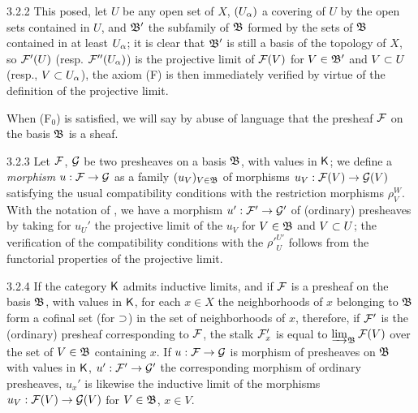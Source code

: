 \documentclass[../main.tex]{subfiles}
\begin{document}
\begin{env}{3.2.2}
This posed, let $U$ be any open set of $X$, $(U_\alpha)$ a covering of $U$ by
the open sets contained in $U$, and $\mathfrak{B}'$ the subfamily of $\mathfrak{B}$ formed by the sets
of $\mathfrak{B}$ contained in at least $U_\alpha$; it is clear that $\mathfrak{B}'$ is still a basis
of the topology of $X$, so $\mathcal{F}'(U)$ (resp. $\mathcal{F}''(U_\alpha)$) is the projective limit of $\mathcal{F}(V)$ for $V\in\mathfrak{B}'$
and $V\subset U$ (resp., $V\subset U_\alpha$), the axiom (F) is then immediately verified by virtue of the definition of the
projective limit.

When (F$_0$) is satisfied, we will say by abuse of language that the presheaf $\mathcal{F}$ on the basis $\mathfrak{B}$ is a sheaf.
\end{env}

\begin{env}{3.2.3}
Let $\mathcal{F}$, $\mathcal{G}$ be two presheaves on a basis $\mathfrak{B}$, with values in $\mathsf{K}$; we define a \emph{morphism}
$u:\mathcal{F}\to\mathcal{G}$ as a family $(u_V)_{V\in\mathfrak{B}}$ of morphisms $u_V:\mathcal{F}(V)\to\mathcal{G}(V)$ satisfying the usual
compatibility conditions with the restriction morphisms $\rho_V^W$. With the notation of ,
we have a morphism $u':\mathcal{F}'\to\mathcal{G}'$ of (ordinary) presheaves by taking for $u_U'$ the projective limit
of the $u_V$ for $V\in\mathfrak{B}$ and $V\subset U$; the verification of the compatibility conditions with
the ${\rho'}_U^{U'}$ follows from the functorial properties of the projective limit.
\end{env}

\begin{env}{3.2.4}
If the category $\mathsf{K}$ admits inductive limits, and if $\mathcal{F}$ is a presheaf on the basis $\mathfrak{B}$, with
values in $\mathsf{K}$, for each $x\in X$ the neighborhoods of $x$ belonging to $\mathfrak{B}$ form a cofinal set
(for $\supset$) in the set of neighborhoods of $x$, therefore, if $\mathcal{F}'$ is the (ordinary) presheaf
corresponding to $\mathcal{F}$, the stalk $\mathcal{F}_x'$ is equal to $\varinjlim_{\mathfrak{B}}\mathcal{F}(V)$ over the set of
$V\in\mathfrak{B}$ containing $x$. If $u:\mathcal{F}\to\mathcal{G}$ is morphism of presheaves on $\mathfrak{B}$ with values in
$\mathsf{K}$, $u':\mathcal{F}'\to\mathcal{G}'$ the corresponding morphism of ordinary presheaves, $u_x'$ is likewise the
inductive limit of the morphisms $u_V:\mathcal{F}(V)\to\mathcal{G}(V)$ for $V\in\mathfrak{B}$, $x\in V$.
\end{env}

\end{document}
